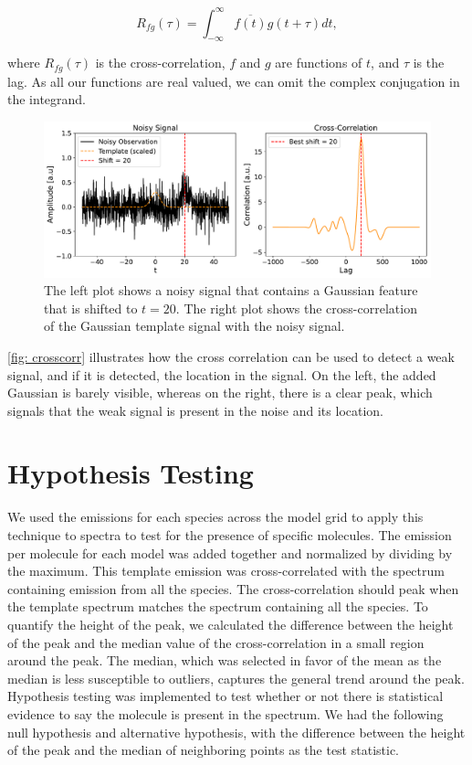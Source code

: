 \documentclass[oneside, single, authoryear, semicolon, 12pt]{lion-msc}
\newcommand{\4}{$_4$}
\newcommand{\3}{$_3$}
\newcommand{\2}{$_2$}
\begin{document}
\begin{equation}
    R_{fg}(\tau)=\int^\infty_{-\infty}\overline{f(t)}g(t+\tau)dt,
\end{equation}

where $R_{fg}(\tau)$ is the cross-correlation, $f$ and $g$ are functions of $t$, and $\tau$ is the lag. As all our functions are real valued, we can omit the complex conjugation in the integrand.

\begin{figure}[H]
    \centering
    \includegraphics[width=\linewidth]{Figures/Correlationexample.pdf}
    \caption{The left plot shows a noisy signal that contains a Gaussian feature that is shifted to $t=20$. The right plot shows the cross-correlation of the Gaussian template signal with the noisy signal.  }
    \label{fig: crosscorr vis}
\end{figure}

\autoref{fig: crosscorr} illustrates how the cross correlation can be used to detect a weak signal, and if it is detected, the location in the signal. On the left, the added Gaussian is barely visible, whereas on the right, there is a clear peak, which signals that the weak signal is present in the noise and its location.

\section{Hypothesis Testing}
We used the emissions for each species across the model grid to apply this technique to spectra to test for the presence of specific molecules. The emission per molecule for each model was added together and normalized by dividing by the maximum. This template emission was cross-correlated with the spectrum containing emission from all the species. The cross-correlation should peak when the template spectrum matches the spectrum containing all the species. To quantify the height of the peak, we calculated the difference between the height of the peak and the median value of the cross-correlation in a small region around the peak. The median, which was selected in favor of the mean as the median is less susceptible to outliers, captures the general trend around the peak. Hypothesis testing was implemented to test whether or not there is statistical evidence to say the molecule is present in the spectrum. We had the following null hypothesis and alternative hypothesis, with the difference between the height of the peak and the median of neighboring points as the test statistic.
\end{document}
